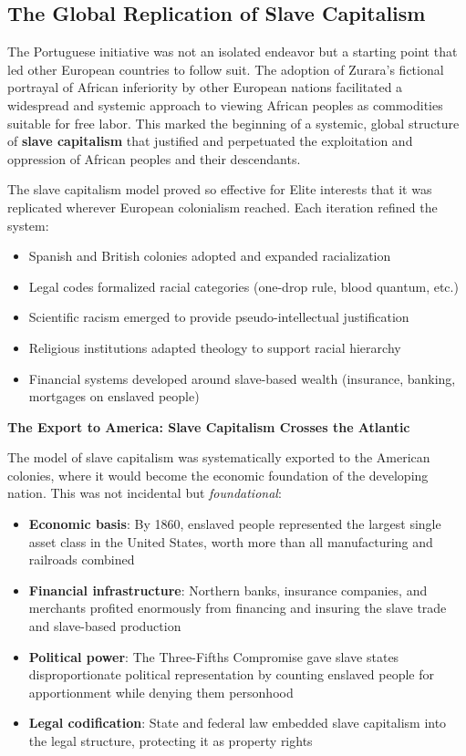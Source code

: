 \documentclass[12pt]{article}
\begin{document}
\subsection{The Global Replication of Slave Capitalism}

The Portuguese initiative was not an isolated endeavor but a starting point that led other European countries to follow suit. The adoption of Zurara's fictional portrayal of African inferiority by other European nations facilitated a widespread and systemic approach to viewing African peoples as commodities suitable for free labor. This marked the beginning of a systemic, global structure of \textbf{slave capitalism} that justified and perpetuated the exploitation and oppression of African peoples and their descendants.

The slave capitalism model proved so effective for Elite interests that it was replicated wherever European colonialism reached. Each iteration refined the system:
\begin{itemize}
    \item Spanish and British colonies adopted and expanded racialization
    \item Legal codes formalized racial categories (one-drop rule, blood quantum, etc.)
    \item Scientific racism emerged to provide pseudo-intellectual justification
    \item Religious institutions adapted theology to support racial hierarchy
    \item Financial systems developed around slave-based wealth (insurance, banking, mortgages on enslaved people) \cite{beckert, johnson}
\end{itemize}

\textbf{The Export to America: Slave Capitalism Crosses the Atlantic}

The model of slave capitalism was systematically exported to the American colonies, where it would become the economic foundation of the developing nation. This was not incidental but \textit{foundational}:

\begin{itemize}
    \item \textbf{Economic basis}: By 1860, enslaved people represented the largest single asset class in the United States, worth more than all manufacturing and railroads combined \cite{baptist, beckert}
    \item \textbf{Financial infrastructure}: Northern banks, insurance companies, and merchants profited enormously from financing and insuring the slave trade and slave-based production
    \item \textbf{Political power}: The Three-Fifths Compromise gave slave states disproportionate political representation by counting enslaved people for apportionment while denying them personhood
    \item \textbf{Legal codification}: State and federal law embedded slave capitalism into the legal structure, protecting it as property rights
\end{itemize}
\end{document}
